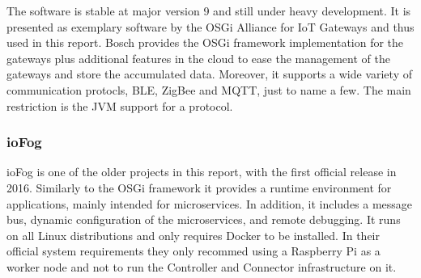 The software is stable at major version 9 and still under heavy development. It is presented as exemplary software by the OSGi Alliance for IoT Gateways \cite{exampleIoTGateweOSGi:online} and thus used in this report. Bosch provides the OSGi framework implementation for the gateways plus additional features in the cloud to ease the management of the gateways and store the accumulated data. Moreover, it supports a wide variety of communication protocls, BLE, ZigBee and MQTT, just to name a few. The main restriction is the JVM support for a protocol.  

\subsubsection{ioFog}
ioFog is one of the older projects in this report, with the first official release in 2016\cite{ioFogMainBlog:online}. Similarly to the OSGi framework it provides a runtime environment for applications, mainly intended for microservices. In addition, it includes a message bus, dynamic configuration of the microservices, and remote debugging\cite{ioFogMainBlog:online}. It runs on all Linux distributions and only requires Docker to be installed. In their official system requirements they only recommed using a Raspberry Pi as a worker node and not to run the Controller and Connector infrastructure on it\cite{ioFOgQuickStart:online}.

